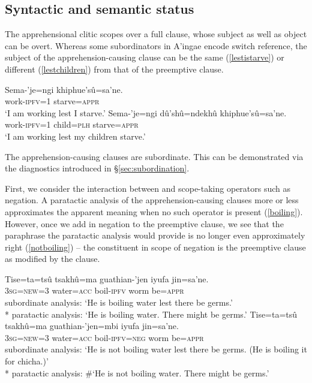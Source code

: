 \documentclass[output=paper,colorlinks,citecolor=brown]{langscibook}
\begin{document}
\subsection{Syntactic and semantic status}

The apprehensional clitic  scopes over a full clause, whose subject as well as object can be overt. Whereas some subordinators in A'ingae encode switch reference, the subject of the apprehension-causing  clause can be the same (\ref{lestistarve}) or different (\ref{lestchildren}) from that of the preemptive clause.
\begin{exe}
    \ex \label{lestistarve} %
    \gll Sema-'je=ngi   {\ob}khiphue'sû=sa'ne.{\cb} \\
        work-\textsc{ipfv=1} starve=\textsc{appr} \\
    \glt `I am working lest I starve.' 
    \ex \label{lestchildren}%
    \gll Sema-'je=ngi  {\ob}dû'shû=ndekhû khiphue'sû=sa'ne.{\cb} \\
        work-\textsc{ipfv=1} child=\textsc{plh}        starve=\textsc{appr} \\
    \glt `I am working lest my children starve.' 
\end{exe}

The apprehension-causing  clauses are subordinate. This can be demonstrated via the diagnostics introduced in \S\ref{sec:subordination}.

First, we consider the interaction between  and scope-taking operators such as negation. A paratactic analysis of the apprehension-causing  clauses more or less approximates the apparent meaning when no such operator is present (\ref{boiling}). However, once we add in negation to the preemptive clause, we see that the paraphrase the paratactic analysis would provide is no longer even approximately right (\ref{notboiling}) -- the constituent in scope of negation is the preemptive clause as modified by the  clause.
\begin{exe}
    \ex \label{boiling}
    \gll Tise=ta=tsû tsakhû=ma guathian-'jen {\ob}iyufa jin=sa'ne.{\cb} \\
         \textsc{3sg=new=3} water=\textsc{acc} boil-\textsc{ipfv} worm be=\textsc{appr}   \\
    \glt subordinate analysis: `He is boiling water lest there be germs.' \\*
    paratactic analysis: `He is boiling water. There might be germs.'
    \ex \label{notboiling}
    \gll  Tise=ta=tsû tsakhû=ma guathian-'jen=mbi {\ob}iyufa jin=sa'ne.{\cb} \\
          \textsc{3sg=new=3} water=\textsc{acc} boil-\textsc{ipfv=neg} worm be=\textsc{appr}   \\
    \glt subordinate analysis: `He is not boiling water lest there be germs. (He is boiling it for chicha.)' \\*
    paratactic analysis: \#`He is not boiling water. There might be germs.'
\end{exe}
    
\end{document}
